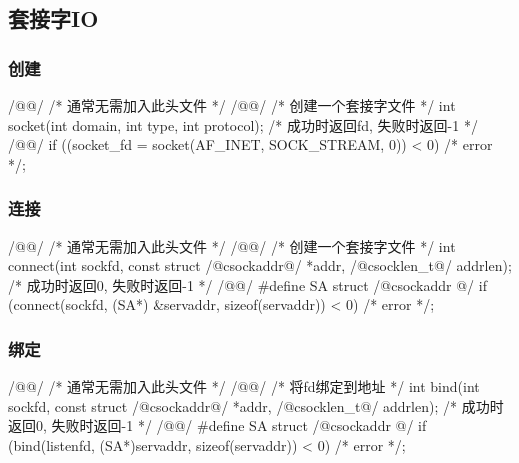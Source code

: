 \documentclass[hidelinks]{ctexart}
\begin{document}

\subsection{套接字IO} %
\label{sub:套接字io}

\subsubsection{创建} %
\label{ssub:创建}

\begin{clst}
/@@/ /* 通常无需加入此头文件 */
/@@/
/* 创建一个套接字文件 */
int socket(int domain, int type, int protocol);
/* 成功时返回fd, 失败时返回-1 */
/@\lhend @/
if ((socket_fd = socket(AF_INET, SOCK_STREAM, 0)) < 0)
    /* error */;
\end{clst}


\subsubsection{连接} %
\label{ssub:连接}

\begin{clst}
/@@/ /* 通常无需加入此头文件 */
/@@/
/* 创建一个套接字文件 */
int connect(int sockfd, const struct /@\+c{sockaddr}@/ *addr,
    /@\+c{socklen\_t}@/ addrlen);
/* 成功时返回0, 失败时返回-1 */
/@\lhend @/
#define SA struct /@\+c{sockaddr} @/
if (connect(sockfd, (SA*) &servaddr, sizeof(servaddr)) < 0)
    /* error */;
\end{clst}


\subsubsection{绑定} %
\label{ssub:绑定}

\begin{clst}
/@@/ /* 通常无需加入此头文件 */
/@@/
/* 将fd绑定到地址 */
int bind(int sockfd, const struct /@\+c{sockaddr}@/ *addr,
    /@\+c{socklen\_t}@/ addrlen);
/* 成功时返回0, 失败时返回-1 */
/@\lhend @/
#define SA struct /@\+c{sockaddr} @/
if (bind(listenfd, (SA*)servaddr, sizeof(servaddr)) < 0)
    /* error */;
\end{clst}
\end{document}
